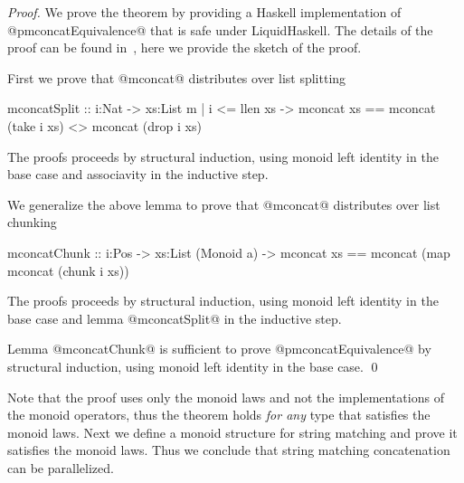 \begin{proof}
We prove the theorem by providing a Haskell implementation of @pmconcatEquivalence@
that is safe under LiquidHaskell. The details of the proof can be found in~\cite{implementation}, 
here we provide the sketch of the proof. 

First we prove that @mconcat@ distributes over list splitting
\begin{code}
mconcatSplit 
  :: i:Nat -> xs:{List m | i <= llen xs} 
  -> { mconcat xs == mconcat (take i xs) 
                 <> mconcat (drop i xs) }
\end{code}
%
The proofs proceeds by structural induction, using monoid left identity in the base case
and associavity in the inductive step.

We generalize the above lemma
to prove that @mconcat@ distributes over list chunking
\begin{code}
mconcatChunk 
  :: i:Pos -> xs:List (Monoid a) 
  -> { mconcat xs == mconcat (map mconcat (chunk i xs)) }
\end{code}
%
The proofs proceeds by structural induction, using monoid left identity in the base case
and lemma @mconcatSplit@ in the inductive step.

Lemma @mconcatChunk@ is sufficient to prove @pmconcatEquivalence@ by structural induction, 
using monoid left identity in the base case. 
\qed\end{proof}

Note that the proof uses only the monoid laws and not the implementations of the monoid
operators, thus the theorem holds \textit{for any} type that satisfies the monoid laws. 
%
Next we define a monoid structure for string matching and prove it satisfies the monoid laws. 
Thus we conclude that string matching concatenation can be parallelized. 
 
